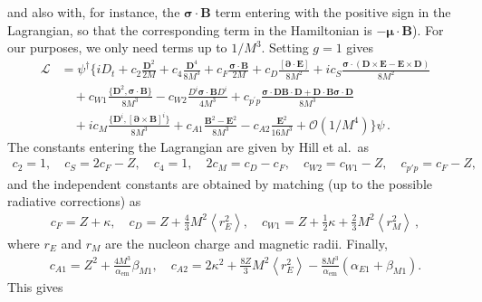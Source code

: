\documentclass[prl,
twocolumn,
showpacs,preprintnumbers,amsmath,amssymb,
superscriptaddress,
a4paper,nofootinbib,longbibliography]{revtex4-2}
\def\nn{\nonumber}
\begin{document}
and also with, for instance, the $\bm{\sigma}\cdot\bm{B}$ term entering with the positive sign in the Lagrangian, so that the corresponding term in the Hamiltonian is $-\bm{\mu}\cdot\bm{B}$).
For our purposes, we only need terms up to $1/M^3$. Setting $g=1$ gives
\begin{align}
\mathcal{L} &= \psi^\dagger
  \bigg\{  i D_t  + c_2 \frac{\bm{D}^2 }{ 2M}  + c_4 \frac{\bm{D}^4 }{ 8 M^3} +
  c_F \frac{ \bm{\sigma}\cdot \bm{B} }{ 2M}   
+ c_D \frac{ [\bm{\partial}\cdot \bm{E}] }{ 8 M^2}  
+ i c_S \frac{ \bm{\sigma} \cdot ( \bm{D} \times \bm{E} - \bm{E}\times \bm{D} ) }{ 8 M^2} 
\nn\\
&\quad
+ c_{W1} \frac{  \{ \bm{D}^2 ,  \bm{\sigma}\cdot \bm{B} \}  }{ 8 M^3}  
- c_{W2} \frac{  D^i \bm{\sigma}\cdot
    \bm{B} D^i }{ 4 M^3 }  + c_{p^\prime p}  \frac{ \bm{\sigma} \cdot
    \bm{D} \bm{B}\cdot \bm{D} + \bm{D}\cdot\bm{B} \bm{\sigma}\cdot \bm{D}
    }{  8 M^3} 
\nn\\
&\quad 
+ i c_M  \frac{ \{ \bm{D}^i ,  [\bm{\partial} \times \bm{B}]^i \} }{ 8 M^3}
+ c_{A1} \frac{ \bm{B}^2 - \bm{E}^2 }{ 8 M^3}  - c_{A2} \frac{ \bm{E}^2 }{ 16 M^3 } 
+ \mathcal{O}(1/M^4)
 \bigg\} \psi  \,.
 \label{eq:abelian3}
 \end{align}
 The constants entering the Lagrangian are given by Hill et al.\ as
 \begin{align}
     c_2 = 1,\quad  c_S = 2 c_F - Z,\quad  c_4 = 1,\quad 2 c_M = c_D - c_F,\quad c_{W2} = c_{W1} - Z,\quad c_{p'p} = c_F - Z,
 \end{align}
 and the independent constants are obtained by matching (up to the possible radiative corrections) as
 \begin{align}
c_F = Z + \kappa,\quad c_D = Z + \frac{4}{3}M^2 \left\langle r_E^2\right\rangle,\quad 
c_{W1} = Z + \frac{1}{2}\kappa +\frac{2}{3}M^2\left\langle r_M^2\right\rangle \,,
 \end{align}
 where $r_E$ and $r_M$ are the nucleon charge and magnetic radii. Finally,
 \begin{align}
     c_{A1} = Z^2 + \frac{4M^3}{\alpha_\mathrm{em}}\beta_{M1},\quad c_{A2} = 2\kappa^2 +\frac{8Z}{3}M^2 \left\langle r_E^2\right\rangle -\frac{8M^3}{\alpha_\mathrm{em}}(\alpha_{E1}+\beta_{M1}).
 \end{align}
This gives
\end{document}
